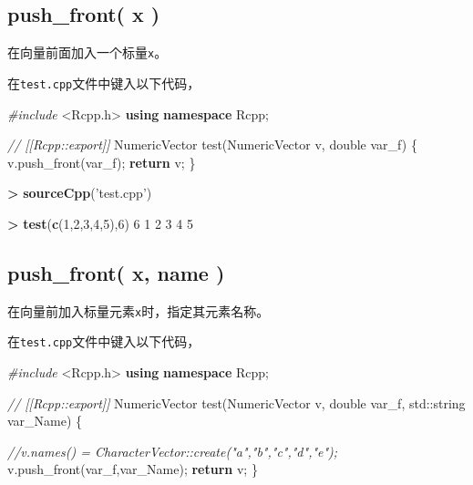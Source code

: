 \documentclass[]{ctexbook}
\newenvironment{Shaded}{\begin{snugshade}}{\end{snugshade}}
\newcommand{\KeywordTok}[1]{\textcolor[rgb]{0.13,0.29,0.53}{\textbf{#1}}}
\newcommand{\DataTypeTok}[1]{\textcolor[rgb]{0.13,0.29,0.53}{#1}}
\newcommand{\DecValTok}[1]{\textcolor[rgb]{0.00,0.00,0.81}{#1}}
\newcommand{\StringTok}[1]{\textcolor[rgb]{0.31,0.60,0.02}{#1}}
\newcommand{\ImportTok}[1]{#1}
\newcommand{\CommentTok}[1]{\textcolor[rgb]{0.56,0.35,0.01}{\textit{#1}}}
\newcommand{\ControlFlowTok}[1]{\textcolor[rgb]{0.13,0.29,0.53}{\textbf{#1}}}
\newcommand{\OperatorTok}[1]{\textcolor[rgb]{0.81,0.36,0.00}{\textbf{#1}}}
\newcommand{\BuiltInTok}[1]{#1}
\newcommand{\PreprocessorTok}[1]{\textcolor[rgb]{0.56,0.35,0.01}{\textit{#1}}}
\newcommand{\NormalTok}[1]{#1}
\begin{document}
\subsection{push\_front( x )}\label{push-front-x}

在向量前面加入一个标量\texttt{x}。

在\texttt{test.cpp}文件中键入以下代码，

\begin{Shaded}
\begin{Highlighting}[]
\PreprocessorTok{#include }\ImportTok{<Rcpp.h>}
\KeywordTok{using} \KeywordTok{namespace}\NormalTok{ Rcpp;}

\CommentTok{// [[Rcpp::export]]}
\NormalTok{NumericVector test(NumericVector v, }
                   \DataTypeTok{double}\NormalTok{ var_f) \{}
\NormalTok{  v.push_front(var_f);}
  \ControlFlowTok{return}\NormalTok{ v;}
\NormalTok{\}}
\end{Highlighting}
\end{Shaded}

\begin{Shaded}
\begin{Highlighting}[]
\OperatorTok{>}\StringTok{ }\KeywordTok{sourceCpp}\NormalTok{(}\StringTok{'test.cpp'}\NormalTok{)}

\OperatorTok{>}\StringTok{ }\KeywordTok{test}\NormalTok{(}\KeywordTok{c}\NormalTok{(}\DecValTok{1}\NormalTok{,}\DecValTok{2}\NormalTok{,}\DecValTok{3}\NormalTok{,}\DecValTok{4}\NormalTok{,}\DecValTok{5}\NormalTok{),}\DecValTok{6}\NormalTok{)}
\DecValTok{6} \DecValTok{1} \DecValTok{2} \DecValTok{3} \DecValTok{4} \DecValTok{5} 
\end{Highlighting}
\end{Shaded}

\subsection{push\_front( x, name )}\label{push-front-name}

在向量前加入标量元素\texttt{x}时，指定其元素名称。

在\texttt{test.cpp}文件中键入以下代码，

\begin{Shaded}
\begin{Highlighting}[]
\PreprocessorTok{#include }\ImportTok{<Rcpp.h>}
\KeywordTok{using} \KeywordTok{namespace}\NormalTok{ Rcpp;}

\CommentTok{// [[Rcpp::export]]}
\NormalTok{NumericVector test(NumericVector v, }
                   \DataTypeTok{double}\NormalTok{ var_f, }
                   \BuiltInTok{std::}\NormalTok{string var_Name) \{}
  
  \CommentTok{//v.names() = CharacterVector::create("a","b","c","d","e");}
\NormalTok{  v.push_front(var_f,var_Name);}
  \ControlFlowTok{return}\NormalTok{ v;}
\NormalTok{\}}
\end{Highlighting}
\end{Shaded}
\end{document}

